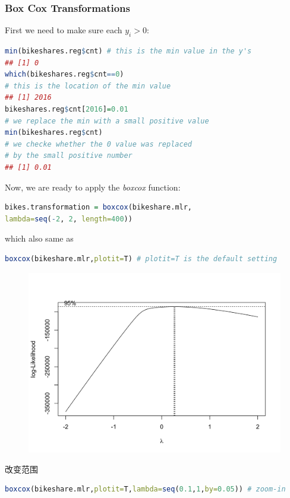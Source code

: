 \documentclass[11pt,a4paper]{article}
\begin{document}
\subsubsection{Box Cox Transformations}
First we need to make sure each $y_i>0$:
\begin{lstlisting}[language=R]
min(bikeshares.reg$cnt) # this is the min value in the y's
## [1] 0
which(bikeshares.reg$cnt==0)
# this is the location of the min value
## [1] 2016
bikeshares.reg$cnt[2016]=0.01
# we replace the min with a small positive value
min(bikeshares.reg$cnt)
# we checke whether the 0 value was replaced 
# by the small positive number
## [1] 0.01
\end{lstlisting}
Now, we are ready to apply the \textit{boxcox} function:
\begin{lstlisting}[language=R]
bikes.transformation = boxcox(bikeshare.mlr,
lambda=seq(-2, 2, length=400))
\end{lstlisting}
which also same as
\begin{lstlisting}[language=R]
boxcox(bikeshare.mlr,plotit=T) # plotit=T is the default setting
\end{lstlisting}
\begin{center}\begin{figure}[htbp]
  \centering
  \includegraphics[scale=0.2]{d6}
  \caption{}
  \label{}
\end{figure}\end{center}
改变范围
\begin{lstlisting}[language=R]
boxcox(bikeshare.mlr,plotit=T,lambda=seq(0.1,1,by=0.05)) # zoom-in
\end{lstlisting}
\end{document}
